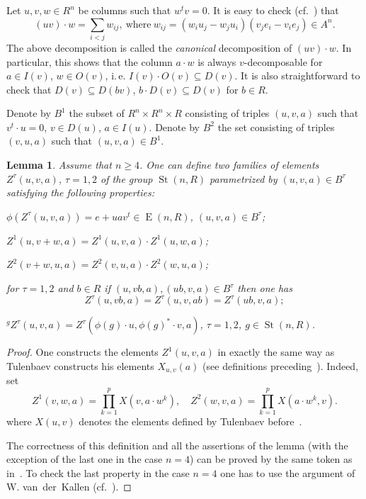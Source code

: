 \documentclass[12pt]{amsart}
\theoremstyle{plain} \declaretheorem[name=Theorem, Refname={Theorem,Theorems}]{thm} \Crefname{thm}{Theorem}{Theorems}
\numberwithin{equation}{section}
\newtheorem{lemma}{Lemma} \numberwithin{lemma}{section} \Crefname{lemma}{Lemma}{Lemmas}
\theoremstyle{definition} \newtheorem{dfn}[lemma]{Definition} \Crefname{dfn}{Definition}{Definitions}
\theoremstyle{remark} \newtheorem{rem}[lemma]{Remark} \Crefname{rem}{Remark}{Remarks}
\newcommand{\St}{\operatorname{\mathrm{St}}}
\newcommand{\E}{\operatorname{\mathrm{E}}}
\begin{document}
Let $u,v,w\in R^n$ be columns such that $w^tv=0$.
It is easy to check (cf.~\cite[Lemma~3.2]{Ka}) that 
$$(uv)\cdot w = \sum_{i<j}w_{ij},\ \text{where}\ w_{ij} = (w_iu_j - w_ju_i)(v_je_i - v_ie_j)\in{}\!A^n.$$
The above decomposition is called the \emph{canonical} decomposition of $(uv)\cdot w$.
In particular, this shows that the column $a\cdot w$ is always $v$-decomposable for $a\in I(v)$, $w \in O(v)$, i.\,e. $I(v) \cdot O(v) \subseteq D(v)$.
It is also straightforward to check that $D(v)\subseteq D(bv)$, $b \cdot D(v) \subseteq D(v)$ for $b \in R$.

Denote by $B^1$ the subset of $R^n \times R^n \times R$ consisting of triples $(u, v, a)$ such that $v^t \cdot u = 0$, $v \in D(u)$, $a \in I(u)$.
Denote by $B^2$ the set consisting of triples $(v, u, a)$ such that $(u, v, a) \in B^1$.

\begin{lemma} \label{lem:Zproperties}
Assume that $n \geq 4$.
One can define two families of elements $Z^\tau(u, v, a)$, $\tau=1,2$ of the group $\St(n, R)$ parametrized by $(u, v, a) \in B^\tau$ satisfying the following properties:
 \begin{lemlist}
  \item \label{item:proj} $\phi(Z^\tau(u, v, a)) = e + uav^t \in \E(n, R)$, $(u,v,a) \in B^\tau$;
  \item \label{item:add1} $Z^{1}(u, v + w, a) = Z^{1}(u, v, a) \cdot Z^{1}(u, w, a)$;
  \item \label{item:add2} $Z^{2}(v + w, u, a) = Z^{2}(v, u, a) \cdot Z^{2}(w, u, a)$;
  \item \label{item:scalar} for $\tau=1,2$ and $b \in R$ if $(u,vb,a), (ub, v, a) \in B^\tau$ then one has
   $$Z^\tau(u,vb, a) = Z^\tau(u, v, ab) = Z^\tau (ub, v, a);	$$
  \item \label{item:conj} ${}^{g}\! Z^{\tau}(u, v, a) = Z^{\tau}(\phi(g) \cdot u, \phi(g)^* \cdot v, a)$, $\tau = 1,2$, $g \in \St(n, R)$.
 \end{lemlist}
\end{lemma}
\begin{proof}
One constructs the elements $Z^1(u,v,a)$ in exactly the same way as Tulenbaev constructs his elements $X_{u,v}(a)$ (see definitions preceding~\cite[Lemma~1.2]{T}).
Indeed, set
\begin{equation} Z^1(v, w, a) = \prod\limits_{k=1}^p X(v, a \cdot w^k), \quad Z^2(w, v, a) = \prod\limits_{k=1}^p X(a \cdot w^k, v). \end{equation}
where $X(u, v)$ denotes the elements defined by Tulenbaev before~\cite[Lemma~1.1]{T}.

The correctness of this definition and all the assertions of the lemma (with the exception of the last one in the case $n=4$) can be proved by the same token as in~\cite[Lemma~1.3]{T}.
To check the last property in the case $n=4$ one has to use the argument of W. van~der~Kallen (cf.~\cite{Ka}).
\end{proof}
\end{document}
